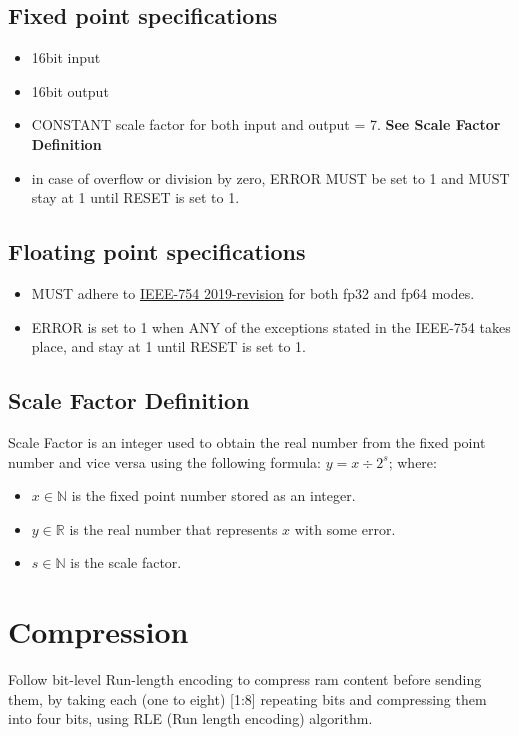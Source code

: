 \documentclass[12pt]{report}
\begin{document}
\subsection{Fixed point specifications}
\begin{itemize}
    \item 16bit input
    \item 16bit output
    \item CONSTANT scale factor for both input and output = 7. \textbf{See Scale Factor Definition}
    \item in case of overflow or division by zero, ERROR MUST be set to 1 and MUST stay at 1 until RESET is set to 1.
\end{itemize}
\subsection{Floating point specifications}
\begin{itemize}
    \item MUST adhere to \href{https://en.wikipedia.org/wiki/IEEE_754}{IEEE-754 2019-revision} for both fp32 and fp64 modes. %
    \item ERROR is set to 1 when ANY of the exceptions stated in the IEEE-754 takes place, and stay at 1 until RESET is set to 1.
\end{itemize}
\subsection{Scale Factor Definition}
Scale Factor is an integer used to obtain the real number from the fixed point number and vice versa using the following formula: 
$y = x \div 2^s$; where: 
\begin{itemize}
    \item $x \in \mathbb{N}$ is the fixed point number stored as an integer.
    \item $y \in \mathbb{R}$ is the real number that represents $x$ with some error.
    \item $s \in \mathbb{N}$ is the scale factor.
\end{itemize}

\section{Compression}
Follow bit-level Run-length encoding to compress ram content before sending them, by taking each (one to eight) [1:8] repeating bits and compressing them into four bits, using RLE (Run length encoding) algorithm.
\end{document}
